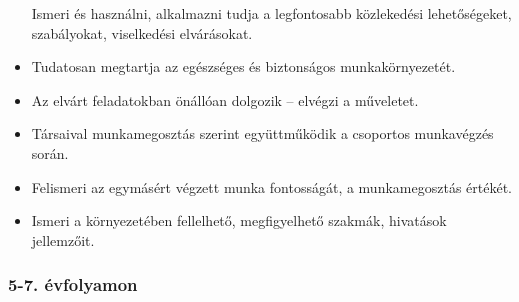 \begin{itemize}
  Ismeri és használni, alkalmazni tudja a legfontosabb közlekedési
  lehetőségeket, szabályokat, viselkedési elvárásokat.
\item
  Tudatosan megtartja az egészséges és biztonságos munkakörnyezetét.
\item
  Az elvárt feladatokban önállóan dolgozik -- elvégzi a műveletet.
\item
  Társaival munkamegosztás szerint együttműködik a csoportos munkavégzés
  során.
\item
  Felismeri az egymásért végzett munka fontosságát, a munkamegosztás
  értékét.
\item
  Ismeri a környezetében fellelhető, megfigyelhető szakmák, hivatások
  jellemzőit.
\end{itemize}

\hypertarget{evfolyamon-30}{%
\subsubsection{5-7. évfolyamon}\label{evfolyamon-30}}

